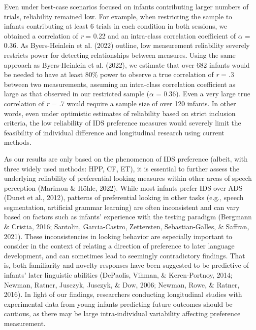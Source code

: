 \documentclass[
  man,floatsintext]{apa6}
\begin{document}
Even under best-case scenarios focused on infants contributing larger numbers of trials, reliability remained low.
For example, when restricting the sample to infants contributing at least 6 trials in each condition in both sessions, we obtained a correlation of \emph{r} = 0.22 and an intra-class correlation coefficient of \(\alpha\) = 0.36.
As Byers-Heinlein et al. (2022) outline, low measurement reliability severely restricts power for detecting relationships between measures.
Using the same approach as Byers-Heinlein et al. (2022), we estimate that over 682 infants would be needed to have at least 80\% power to observe a true correlation of \emph{r} = .3 between two measurements, assuming an intra-class correlation coefficient as large as that observed in our restricted sample (\(\alpha\) = 0.36).
Even a very large true correlation of \emph{r} = .7 would require a sample size of over 120 infants.
In other words, even under optimistic estimates of reliability based on strict inclusion criteria, the low reliability of IDS preference measures would severely limit the feasibility of individual difference and longitudinal research using current methods.

As our results are only based on the phenomenon of IDS preference (albeit, with three widely used methods: HPP, CF, ET), it is essential to further assess the underlying reliability of preferential looking measures within other areas of speech perception (Marimon \& Höhle, 2022).
While most infants prefer IDS over ADS (Dunst et al., 2012), patterns of preferential looking in other tasks (e.g., speech segmentation, artificial grammar learning) are often inconsistent and can vary based on factors such as infants' experience with the testing paradigm (Bergmann \& Cristia, 2016; Santolin, Garcia-Castro, Zettersten, Sebastian-Galles, \& Saffran, 2021).
These inconsistencies in looking behavior are especially important to consider in the context of relating a direction of preference to later language development, and can sometimes lead to seemingly contradictory findings.
That is, both familiarity and novelty responses have been suggested to be predictive of infants' later linguistic abilities (DePaolis, Vihman, \& Keren-Portnoy, 2014; Newman, Ratner, Jusczyk, Jusczyk, \& Dow, 2006; Newman, Rowe, \& Ratner, 2016).
In light of our findings, researchers conducting longitudinal studies with experimental data from young infants predicting future outcomes should be cautious, as there may be large intra-individual variability affecting preference measurement.
\end{document}
